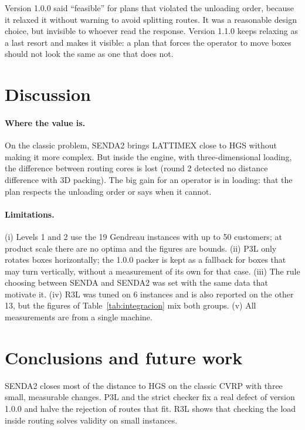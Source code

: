 \documentclass[11pt,a4paper]{article}
\newcommand{\senda}{SENDA}
\newcommand{\sendados}{SENDA2}
\begin{document}
\begin{leccion}
Version 1.0.0 said ``feasible'' for plans that violated the unloading order, because it relaxed it
without warning to avoid splitting routes. It was a reasonable design choice, but invisible to whoever
read the response. Version 1.1.0 keeps relaxing as a last resort and makes it visible: a plan that forces
the operator to move boxes should not look the same as one that does not.
\end{leccion}

\section{Discussion}
\label{sec:discusion}

\paragraph{Where the value is.} On the classic problem, \sendados{} brings LATTIMEX close to HGS without
making it more complex. But inside the engine, with three-dimensional loading, the difference between
routing cores is lost (round 2 detected no distance difference with 3D packing). The big gain for an
operator is in loading: that the plan respects the unloading order or says when it cannot.

\paragraph{Limitations.}
(i) Levels 1 and 2 use the 19 Gendreau instances with up to 50 customers; at product scale there are no
optima and the figures are bounds.
(ii) P3L only rotates boxes horizontally; the 1.0.0 packer is kept as a fallback for boxes that may
turn vertically, without a measurement of its own for that case.
(iii) The rule choosing between \senda{} and \sendados{} was set with the same data that motivate it.
(iv) R3L was tuned on 6 instances and is also reported on the other 13, but the figures of
Table~\ref{tab:integracion} mix both groups.
(v) All measurements are from a single machine.

\section{Conclusions and future work}

\sendados{} closes most of the distance to HGS on the classic CVRP with three small, measurable changes.
P3L and the strict checker fix a real defect of version 1.0.0 and halve the rejection of routes that
fit. R3L shows that checking the load inside routing solves validity on small instances.
\end{document}
